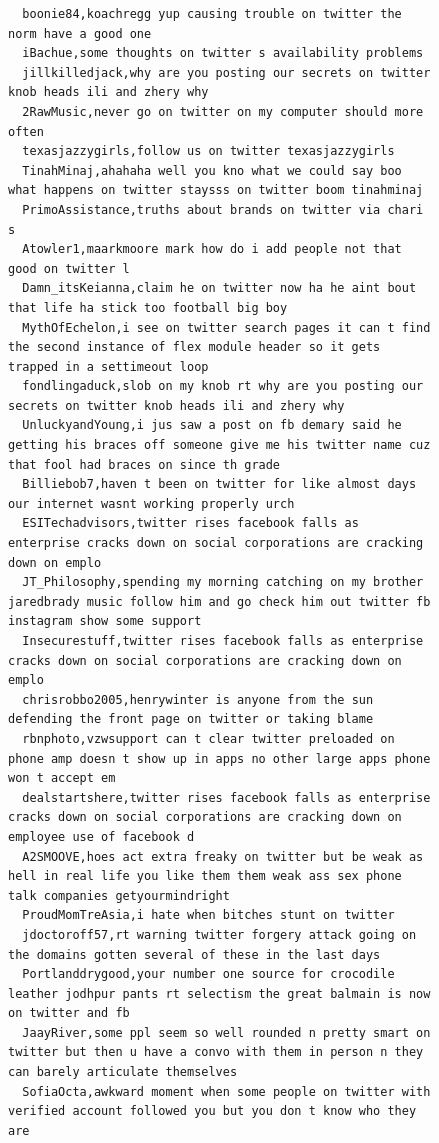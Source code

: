 \begin{figure}[htpb]
\begin{verbatim}
  boonie84,koachregg yup causing trouble on twitter the norm have a good one
  iBachue,some thoughts on twitter s availability problems
  jillkilledjack,why are you posting our secrets on twitter knob heads ili and zhery why
  2RawMusic,never go on twitter on my computer should more often
  texasjazzygirls,follow us on twitter texasjazzygirls
  TinahMinaj,ahahaha well you kno what we could say boo what happens on twitter staysss on twitter boom tinahminaj
  PrimoAssistance,truths about brands on twitter via chari s
  Atowler1,maarkmoore mark how do i add people not that good on twitter l
  Damn_itsKeianna,claim he on twitter now ha he aint bout that life ha stick too football big boy
  MythOfEchelon,i see on twitter search pages it can t find the second instance of flex module header so it gets trapped in a settimeout loop
  fondlingaduck,slob on my knob rt why are you posting our secrets on twitter knob heads ili and zhery why
  UnluckyandYoung,i jus saw a post on fb demary said he getting his braces off someone give me his twitter name cuz that fool had braces on since th grade
  Billiebob7,haven t been on twitter for like almost days our internet wasnt working properly urch
  ESITechadvisors,twitter rises facebook falls as enterprise cracks down on social corporations are cracking down on emplo
  JT_Philosophy,spending my morning catching on my brother jaredbrady music follow him and go check him out twitter fb instagram show some support
  Insecurestuff,twitter rises facebook falls as enterprise cracks down on social corporations are cracking down on emplo
  chrisrobbo2005,henrywinter is anyone from the sun defending the front page on twitter or taking blame
  rbnphoto,vzwsupport can t clear twitter preloaded on phone amp doesn t show up in apps no other large apps phone won t accept em
  dealstartshere,twitter rises facebook falls as enterprise cracks down on social corporations are cracking down on employee use of facebook d
  A2SMOOVE,hoes act extra freaky on twitter but be weak as hell in real life you like them them weak ass sex phone talk companies getyourmindright
  ProudMomTreAsia,i hate when bitches stunt on twitter
  jdoctoroff57,rt warning twitter forgery attack going on the domains gotten several of these in the last days
  Portlanddrygood,your number one source for crocodile leather jodhpur pants rt selectism the great balmain is now on twitter and fb
  JaayRiver,some ppl seem so well rounded n pretty smart on twitter but then u have a convo with them in person n they can barely articulate themselves
  SofiaOcta,awkward moment when some people on twitter with verified account followed you but you don t know who they are

\end{verbatim}
\end{figure}
